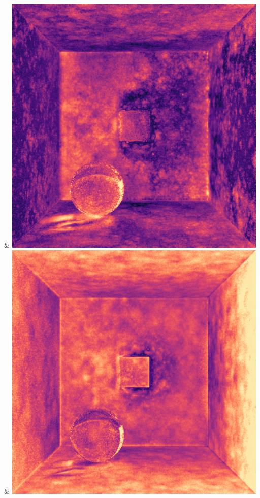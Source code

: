 & \includegraphics[width=\linewidth]{figures/py/tests/quality_comparison/nrc+pt_1spp_ajar_caustic_flip.png}
& \includegraphics[width=\linewidth]{figures/py/tests/quality_comparison/nrc+pt+sl_1spp_ajar_caustic_flip.png}
